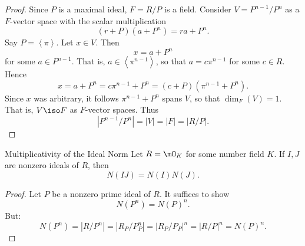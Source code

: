 \documentclass[pmath441]{subfiles}
\begin{document}
\begin{proof}
        Since $P$ is a maximal ideal, $F = R /P$ is a field. Consider $V = P^{n-1} /P^n$ as a $F$-vector space with the scalar multiplication
        \begin{equation*}
            \left( r+P \right)\left( a+P^n \right) = ra+P^n.
        \end{equation*}
        Say $P = \left< \pi \right>$. Let $x\in V$. Then
        \begin{equation*}
            x = a+P^n
        \end{equation*}
        for some $a\in P^{n-1}$. That is, $a \in\left< \pi^{n-1} \right>$, so that $a=c\pi^{n-1}$ for some $c\in R$. Hence
        \begin{equation*}
            x = a+P^n = c\pi^{n-1}+P^n = \left( c+P \right)\left( \pi^{n-1}+P^n \right).
        \end{equation*}
        Since $x$ was arbitrary, it follows $\pi^{n-1}+P^n$ spans $V$, so that $\dim_F\left( V \right) = 1$. That is, $V\iso F$ as $F$-vector spaces. Thus
        \begin{equation*}
            \left| P^{n-1} /P^n \right| = \left| V \right| = \left| F \right| = \left| R /P \right|.
        \end{equation*}
    \end{proof}
    
    \clearpage

    \begin{theorem}{Multiplicativity of the Ideal Norm}
        Let $R = \mO_K$ for some number field $K$. If $I,J$ are nonzero ideals of $R$, then
        \begin{equation*}
            N\left( IJ \right) = N\left( I \right)N\left( J \right).
        \end{equation*}
    \end{theorem}
    
    \begin{proof}
        Let $P$ be a nonzero prime ideal of $R$. It suffices to show
        \begin{equation*}
            N\left( P^n \right) = N\left( P \right)^n.
        \end{equation*}
        But:
        \begin{equation*}
            N\left( P^n \right) = \left| R /P^n \right| = \left| R_P /P_P^n \right| = \left| R_P /P_P \right|^n = \left| R /P \right|^n = N\left( P \right)^n.
        \end{equation*}
    \end{proof}
    
    
    
    
    
    
    
    
    
    
    
    
    
    
    
    
    
    
    
    
    
    
    
    
    
    
    
    
    
    
    
    
    
    
    
    
    
\end{document}
